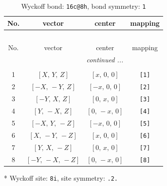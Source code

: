 \documentclass[fleqn,8pt]{jsarticle}
\begin{document}
\renewcommand{\arraystretch}{1.2}
\begin{longtable}{cccc}
\caption{Wyckoff bond: {\tt 16c@8h}, bond symmetry: {\tt 1}}
 \\
 \hline \hline
No. & vector & center & mapping \\ \hline \endfirsthead

\multicolumn{3}{l}{\tablename\ \thetable{}} \\
 \hline \hline
No. & vector & center & mapping \\ \hline \endhead

 \hline \hline
\multicolumn{3}{r}{\footnotesize\it continued ...} \\ \endfoot

 \hline \hline
\multicolumn{3}{r}{} \\ \endlastfoot

1 & $\left[ X,\, Y,\, Z \right]$ & $\left[ x,\, 0,\, 0 \right]$ & {\tt [1]} \\ \hline
2 & $\left[ - X,\, - Y,\, Z \right]$ & $\left[ - x,\, 0,\, 0 \right]$ & {\tt [2]} \\ \hline
3 & $\left[ - Y,\, X,\, Z \right]$ & $\left[ 0,\, x,\, 0 \right]$ & {\tt [3]} \\ \hline
4 & $\left[ Y,\, - X,\, Z \right]$ & $\left[ 0,\, - x,\, 0 \right]$ & {\tt [4]} \\ \hline
5 & $\left[ - X,\, Y,\, - Z \right]$ & $\left[ - x,\, 0,\, 0 \right]$ & {\tt [5]} \\ \hline
6 & $\left[ X,\, - Y,\, - Z \right]$ & $\left[ x,\, 0,\, 0 \right]$ & {\tt [6]} \\ \hline
7 & $\left[ Y,\, X,\, - Z \right]$ & $\left[ 0,\, x,\, 0 \right]$ & {\tt [7]} \\ \hline
8 & $\left[ - Y,\, - X,\, - Z \right]$ & $\left[ 0,\, - x,\, 0 \right]$ & {\tt [8]} \\
\end{longtable}
* Wyckoff site: {\tt 8i}, site symmetry: {\tt .2.}
\renewcommand{\arraystretch}{1.2}
\end{document}
